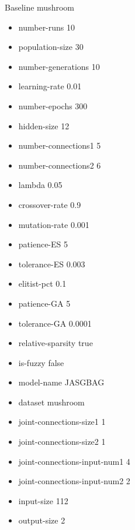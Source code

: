 Baseline
mushroom
\begin{itemize}
\item number-runs 10
\item population-size 30
\item number-generations 10
\item learning-rate 0.01
\item number-epochs 300
\item hidden-size 12
\item number-connections1 5
\item number-connections2 6
\item lambda 0.05
\item crossover-rate 0.9
\item mutation-rate 0.001
\item patience-ES 5
\item tolerance-ES 0.003
\item elitist-pct 0.1
\item patience-GA 5
\item tolerance-GA 0.0001
\item relative-sparsity true
\item is-fuzzy false
\item model-name JASGBAG
\item dataset mushroom
\item joint-connections-size1 1
\item joint-connections-size2 1
\item joint-connections-input-num1 4
\item joint-connections-input-num2 2
\item input-size 112
\item output-size 2
\end{itemize}


